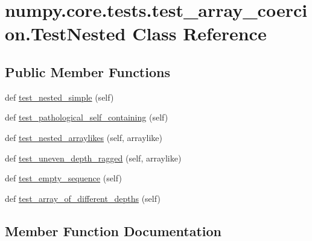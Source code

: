 \hypertarget{classnumpy_1_1core_1_1tests_1_1test__array__coercion_1_1TestNested}{}\section{numpy.\+core.\+tests.\+test\+\_\+array\+\_\+coercion.\+Test\+Nested Class Reference}
\label{classnumpy_1_1core_1_1tests_1_1test__array__coercion_1_1TestNested}
\subsection*{Public Member Functions}
\begin{DoxyCompactItemize}
\item 
def \hyperlink{classnumpy_1_1core_1_1tests_1_1test__array__coercion_1_1TestNested_a785729deceae8c8236589ffefb85cc58}{test\+\_\+nested\+\_\+simple} (self)
\item 
def \hyperlink{classnumpy_1_1core_1_1tests_1_1test__array__coercion_1_1TestNested_a67b51b7ed807670d2aedab952c075ffd}{test\+\_\+pathological\+\_\+self\+\_\+containing} (self)
\item 
def \hyperlink{classnumpy_1_1core_1_1tests_1_1test__array__coercion_1_1TestNested_ad57f6aee26b2097ae4d33c73f37e8ed2}{test\+\_\+nested\+\_\+arraylikes} (self, arraylike)
\item 
def \hyperlink{classnumpy_1_1core_1_1tests_1_1test__array__coercion_1_1TestNested_aae0e18c5cdcdd75d225d26250f7eea9b}{test\+\_\+uneven\+\_\+depth\+\_\+ragged} (self, arraylike)
\item 
def \hyperlink{classnumpy_1_1core_1_1tests_1_1test__array__coercion_1_1TestNested_a3b10fe718fb396c1a63786a7a00a8061}{test\+\_\+empty\+\_\+sequence} (self)
\item 
def \hyperlink{classnumpy_1_1core_1_1tests_1_1test__array__coercion_1_1TestNested_ae781f93fc2adeeb6daa517671189fc36}{test\+\_\+array\+\_\+of\+\_\+different\+\_\+depths} (self)
\end{DoxyCompactItemize}


\subsection{Member Function Documentation}
\mbox{\label{classnumpy_1_1core_1_1tests_1_1test__array__coercion_1_1TestNested_ae781f93fc2adeeb6daa517671189fc36}} 
